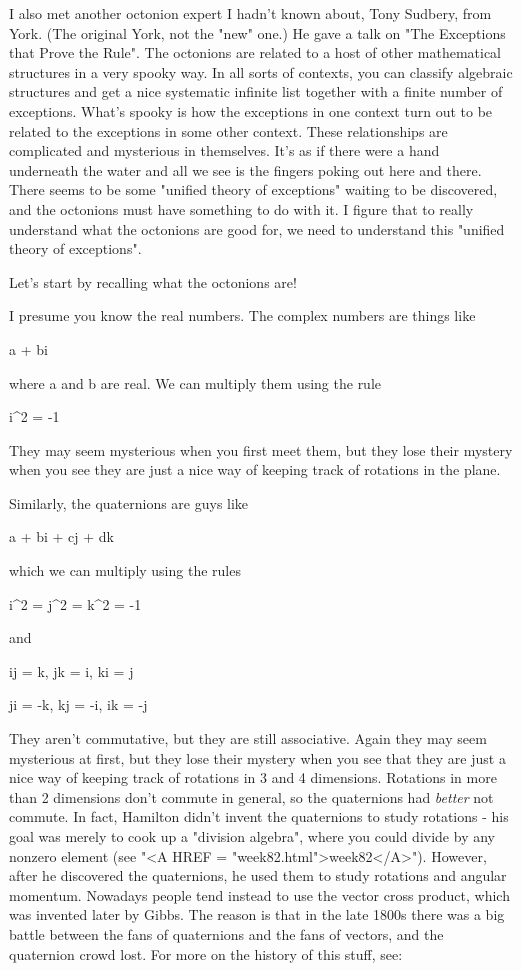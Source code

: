 I also met another octonion expert I hadn't known about, Tony Sudbery,
from York.  (The original York, not the "new" one.)  He gave a talk on
"The Exceptions that Prove the Rule".  The octonions are related to a
host of other mathematical structures in a very spooky way.  In all
sorts of contexts, you can classify algebraic structures and get a nice
systematic infinite list together with a finite number of exceptions.
What's spooky is how the exceptions in one context turn out to be
related to the exceptions in some other context.  These relationships
are complicated and mysterious in themselves.  It's as if there were a
hand underneath the water and all we see is the fingers poking out here
and there.  There seems to be some "unified theory of exceptions"
waiting to be discovered, and the octonions must have something to do
with it.  I figure that to really understand what the octonions are good
for, we need to understand this "unified theory of exceptions".

Let's start by recalling what the octonions are!

I presume you know the real numbers.  The complex numbers are things
like

a + bi

where a and b are real.  We can multiply them using the rule 

i^{2} = -1

They may seem mysterious when you first meet them, but they lose their
mystery when you see they are just a nice way of keeping track of
rotations in the plane.

Similarly, the quaternions are guys like 

a + bi + cj + dk 

which we can multiply using the rules

i^{2} = j^{2} = k^{2} = -1

and 

ij =  k,  jk =  i,  ki =  j


ji = -k,  kj = -i,  ik = -j

They aren't commutative, but they are still associative.  Again they may
seem mysterious at first, but they lose their mystery when you see that
they are just a nice way of keeping track of rotations in 3 and 4
dimensions.  Rotations in more than 2 dimensions don't commute in
general, so the quaternions had \emph{better} not commute.  In fact, Hamilton
didn't invent the quaternions to study rotations - his goal was merely
to cook up a "division algebra", where you could divide by any nonzero
element (see "<A HREF = "week82.html">week82</A>").  However, after he discovered the quaternions,
he used them to study rotations and angular momentum.  Nowadays people
tend instead to use the vector cross product, which was invented later
by Gibbs.  The reason is that in the late 1800s there was a big battle
between the fans of quaternions and the fans of vectors, and the
quaternion crowd lost.  For more on the history of this stuff, see:

